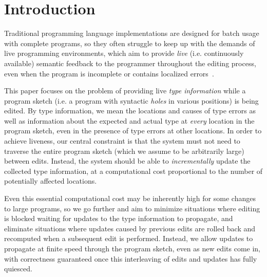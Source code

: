 \section{Introduction}%
\label{sec:Introduction}


Traditional programming language implementations are 
designed for batch usage with complete programs, so they often struggle to keep up
with the demands of live programming environments, which aim to provide \emph{live} (i.e. continuously available) semantic feedback to the programmer throughout the editing process, even when the program is incomplete or contains localized errors~\cite{omar2017a}.

This paper focuses on the problem of providing live \emph{type information} while a program sketch (i.e. a program with syntactic \emph{holes} in various positions) is being edited. By type information, we mean the locations and causes of type errors as well as information about the expected and actual type at \emph{every} location in the program sketch, even in the presence of type errors at other locations. 
In order to achieve liveness, our central constraint is that the system must not need to traverse the entire program sketch (which we assume to be arbitrarily large) between edits. Instead, the system should be able to \emph{incrementally} update the collected type information, at a computational cost proportional to the number of potentially affected locations. 

Even this essential computational cost may be inherently high for some changes to large programs, so we go further and aim to minimize situations where editing is blocked waiting for updates to the type information to propagate, and eliminate situations where updates caused by previous edits are rolled back and recomputed when a subsequent edit is performed. Instead, we allow updates to propagate at finite speed through the program sketch, even as new edits come in, with correctness guaranteed once this interleaving of edits and updates has fully quiesced.

